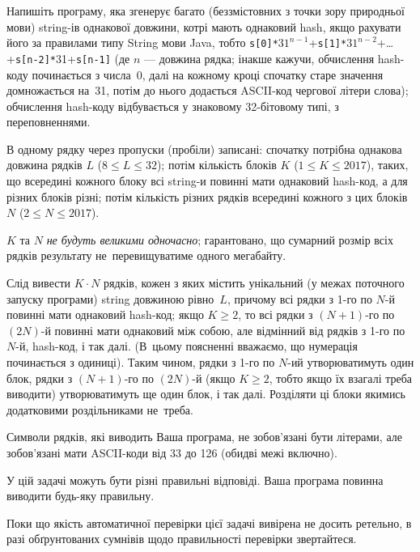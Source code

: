 ﻿ Напишіть програму, яка згенерує багато (беззмістовних з точки зору природньої мови) string-ів однакової довжини, котрі мають однаковий hash, якщо рахувати його за правилами типу String мови Java, тобто {\tt s[0]*}$31^{n-1}$+{\tt s[1]*}$31^{n-2}$+\dots+{\tt s[n-2]*}31+{\tt s[n-1]} (де $n$ --- довжина рядка; інакше кажучи, обчислення hash-коду починається з числа~0, далі на кожному кроці спочатку старе значення домножається на~31, потім до нього додається ASCII-код чергової літери слова); обчислення hash-коду відбувається у знаковому 32-бітовому типі, з переповненнями.

\InputFile
В одному рядку через пропуски (пробіли) записані: спочатку потрібна однакова довжина рядків $L$ ($8\leqslant L\leqslant 32$); потім кількість блоків $K$ ($1\leqslant K\leqslant 2017$), таких, що всередині кожного блоку всі string-и повинні мати однаковий hash-код, а для різних блоків різні; потім кількість різних рядків всередині кожного з цих блоків $N$ ($2\leqslant N\leqslant 2017$).

$K$ та $N$ {\it не будуть великими одночасно}; гарантовано, що сумарний розмір всіх рядків результату не~перевищуватиме одного мегабайту.

\OutputFile
Слід вивести $K\cdot N$ рядків, кожен з яких містить унікальний (у межах поточного запуску програми) string довжиною рівно~$L$, причому всі рядки з 1-го по $N$-й повинні мати однаковий hash-код; якщо $K\geqslant 2$, то всі рядки з $(N+1)$-го по $(2N)$-й повинні мати однаковий між собою, але відмінний від рядків з 1-го по $N$-й, hash-код, і так далі. (В~цьому поясненні вважаємо, що нумерація починається з одиниці). Таким чином, рядки з 1-го по $N$-ий утворюватимуть один блок, рядки з $(N+1)$-го по $(2N)$-й (якщо $K\geqslant 2$, тобто якщо їх взагалі треба виводити) утворюватимуть ще один блок, і так далі. Розділяти ці блоки якимись додатковими роздільниками не~треба.

Символи рядків, які виводить Ваша програма, не зобов'язані бути літерами, але зобов'язані мати ASCII-коди від 33 до 126 (обидві межі включно).

\begin{example}
\end{example}

\Note

У цій задачі можуть бути різні правильні відповіді. Ваша програма повинна виводити будь-яку правильну.

Поки що якість автоматичної перевірки цієї задачі вивірена не досить ретельно, в разі обґрунтованих сумнівів щодо правильності перевірки звертайтеся.

